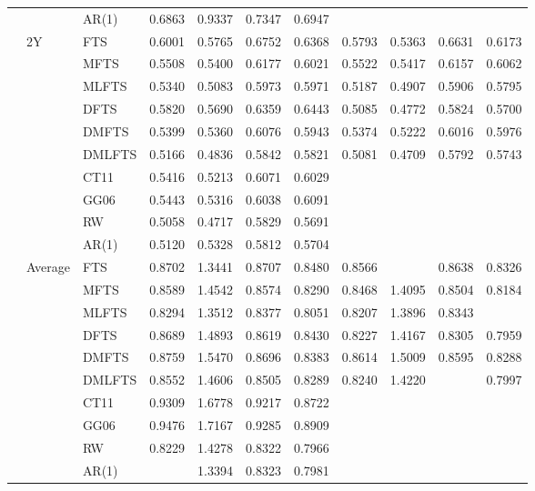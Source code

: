 \documentclass[12pt,a4paper]{article}
\def\textBF#1{\sbox\CBox{#1}\resizebox{\wd\CBox}{\ht\CBox}{\textbf{#1}}}
\begin{document}
\begin{center}
\begin{small}
\begin{longtable}{@{}lllcccccccc@{}}
& & AR(1) & 0.6863 & 0.9337 & 0.7347 & 0.6947  \\
\cmidrule{2-11}
     & 2Y  & FTS & 0.6001 & 0.5765 & 0.6752 & 0.6368 & 0.5793 & 0.5363 & 0.6631 & 0.6173 \\ 
& & MFTS & 0.5508 & 0.5400 & 0.6177 & 0.6021 & 0.5522 & 0.5417 & 0.6157 & 0.6062 \\ 
& & MLFTS & 0.5340 & 0.5083 & 0.5973 & 0.5971 & 0.5187 & 0.4907 & 0.5906 & 0.5795 \\
& & DFTS & 0.5820 & 0.5690 & 0.6359 & 0.6443 & 0.5085 & 0.4772 & 0.5824 & 0.5700 \\ 
& & DMFTS & 0.5399 & 0.5360 & 0.6076 & 0.5943 & 0.5374 & 0.5222 & 0.6016 & 0.5976 \\ 
& & DMLFTS & 0.5166 & 0.4836 & 0.5842 & 0.5821 & 0.5081 & 0.4709 & 0.5792 & 0.5743 \\
& & CT11 & 0.5416 & 0.5213 & 0.6071 & 0.6029 \\
& & GG06 & 0.5443 & 0.5316 & 0.6038 & 0.6091 \\
& & RW & 0.5058 & 0.4717 & 0.5829 & 0.5691 \\
& & AR(1) & 0.5120 & 0.5328 & 0.5812 & 0.5704 \\
\cmidrule{2-11}
     & Average & FTS & 0.8702 & 1.3441 & 0.8707 & 0.8480 & 0.8566 & \textBF{1.3347} & 0.8638 & 0.8326 \\ 
  & & MFTS & 0.8589 & 1.4542 & 0.8574 & 0.8290 & 0.8468 & 1.4095 & 0.8504 & 0.8184 \\
  & & MLFTS & 0.8294 & 1.3512 & 0.8377 & 0.8051 & 0.8207 & 1.3896 & 0.8343 & \textBF{0.7917} \\
  & & DFTS & 0.8689 & 1.4893 & 0.8619 & 0.8430 & 0.8227 & 1.4167 & 0.8305 & 0.7959 \\ 
  & & DMFTS & 0.8759 & 1.5470 & 0.8696 & 0.8383 & 0.8614 & 1.5009 & 0.8595 & 0.8288 \\
  & & DMLFTS & 0.8552 & 1.4606 & 0.8505 & 0.8289 & 0.8240 & 1.4220 & \textBF{0.8293} & 0.7997 \\
  & & CT11 & 0.9309 & 1.6778 & 0.9217 & 0.8722 \\
  & & GG06 & 0.9476 & 1.7167 & 0.9285 & 0.8909  \\
  & & RW & 0.8229 & 1.4278 & 0.8322 & 0.7966 \\
  & & AR(1) & \textBF{0.8204} & 1.3394 & 0.8323 & 0.7981 \\
\bottomrule
\end{longtable}
\end{small}
\end{center}
\end{document}

